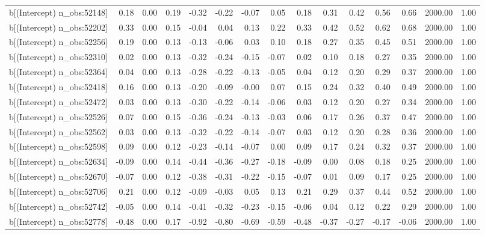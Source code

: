 \begin{table}[ht]
\begin{tabular}{rrrrrrrrrrrrrrr}
  b[(Intercept) n\_obs:52148] & 0.18 & 0.00 & 0.19 & -0.32 & -0.22 & -0.07 & 0.05 & 0.18 & 0.31 & 0.42 & 0.56 & 0.66 & 2000.00 & 1.00 \\ 
  b[(Intercept) n\_obs:52202] & 0.33 & 0.00 & 0.15 & -0.04 & 0.04 & 0.13 & 0.22 & 0.33 & 0.42 & 0.52 & 0.62 & 0.68 & 2000.00 & 1.00 \\ 
  b[(Intercept) n\_obs:52256] & 0.19 & 0.00 & 0.13 & -0.13 & -0.06 & 0.03 & 0.10 & 0.18 & 0.27 & 0.35 & 0.45 & 0.51 & 2000.00 & 1.00 \\ 
  b[(Intercept) n\_obs:52310] & 0.02 & 0.00 & 0.13 & -0.32 & -0.24 & -0.15 & -0.07 & 0.02 & 0.10 & 0.18 & 0.27 & 0.35 & 2000.00 & 1.00 \\ 
  b[(Intercept) n\_obs:52364] & 0.04 & 0.00 & 0.13 & -0.28 & -0.22 & -0.13 & -0.05 & 0.04 & 0.12 & 0.20 & 0.29 & 0.37 & 2000.00 & 1.00 \\ 
  b[(Intercept) n\_obs:52418] & 0.16 & 0.00 & 0.13 & -0.20 & -0.09 & -0.00 & 0.07 & 0.15 & 0.24 & 0.32 & 0.40 & 0.49 & 2000.00 & 1.00 \\ 
  b[(Intercept) n\_obs:52472] & 0.03 & 0.00 & 0.13 & -0.30 & -0.22 & -0.14 & -0.06 & 0.03 & 0.12 & 0.20 & 0.27 & 0.34 & 2000.00 & 1.00 \\ 
  b[(Intercept) n\_obs:52526] & 0.07 & 0.00 & 0.15 & -0.36 & -0.24 & -0.13 & -0.03 & 0.06 & 0.17 & 0.26 & 0.37 & 0.47 & 2000.00 & 1.00 \\ 
  b[(Intercept) n\_obs:52562] & 0.03 & 0.00 & 0.13 & -0.32 & -0.22 & -0.14 & -0.07 & 0.03 & 0.12 & 0.20 & 0.28 & 0.36 & 2000.00 & 1.00 \\ 
  b[(Intercept) n\_obs:52598] & 0.09 & 0.00 & 0.12 & -0.23 & -0.14 & -0.07 & 0.00 & 0.09 & 0.17 & 0.24 & 0.32 & 0.37 & 2000.00 & 1.00 \\ 
  b[(Intercept) n\_obs:52634] & -0.09 & 0.00 & 0.14 & -0.44 & -0.36 & -0.27 & -0.18 & -0.09 & 0.00 & 0.08 & 0.18 & 0.25 & 2000.00 & 1.00 \\ 
  b[(Intercept) n\_obs:52670] & -0.07 & 0.00 & 0.12 & -0.38 & -0.31 & -0.22 & -0.15 & -0.07 & 0.01 & 0.09 & 0.17 & 0.25 & 2000.00 & 1.00 \\ 
  b[(Intercept) n\_obs:52706] & 0.21 & 0.00 & 0.12 & -0.09 & -0.03 & 0.05 & 0.13 & 0.21 & 0.29 & 0.37 & 0.44 & 0.52 & 2000.00 & 1.00 \\ 
  b[(Intercept) n\_obs:52742] & -0.05 & 0.00 & 0.14 & -0.41 & -0.32 & -0.23 & -0.15 & -0.06 & 0.04 & 0.12 & 0.22 & 0.29 & 2000.00 & 1.00 \\ 
  b[(Intercept) n\_obs:52778] & -0.48 & 0.00 & 0.17 & -0.92 & -0.80 & -0.69 & -0.59 & -0.48 & -0.37 & -0.27 & -0.17 & -0.06 & 2000.00 & 1.00 \\ 

\end{tabular}
\end{table}
